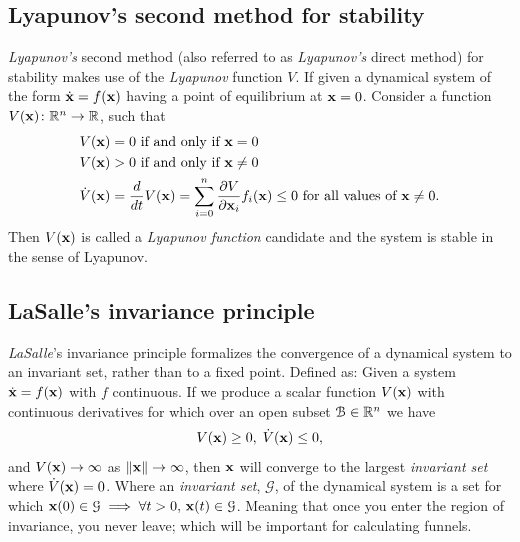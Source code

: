 \subsection{Lyapunov's second method for stability}

\textit{Lyapunov's} second method (also referred to as \textit{Lyapunov's}
direct method) for stability makes use of the \textit{Lyapunov} function \(V\).
If given a dynamical system of the form \(\dot{\mathbf{x}} = f(\mathbf{x})\) having
a point of equilibrium at \(\mathbf{x} = 0\). Consider a function \(V(\mathbf{x})
\colon \mathbb{R}^n \rightarrow \mathbb{R}\), such that
\begin{align*}
  V(\mathbf{x}) &= 0 \text{ if and only if } \mathbf{x} = 0 \\
  V(\mathbf{x}) &> 0 \text{ if and only if } \mathbf{x} \neq 0 \\
  \dot{V}(\mathbf{x}) &= \frac{d}{dt}V(\mathbf{x}) = \sum_{i=0}^{n} \frac{\partial V}{\partial \mathbf{x}_i} f_i(\mathbf{x}) \leq 0 \text{ for all values of } \mathbf{x} \neq 0. \\
\end{align*}
Then \(V(\mathbf{x})\) is called a \textit{Lyapunov function} candidate and the
system is stable in the sense of Lyapunov.

\subsection{LaSalle's invariance principle}
\label{subsec:LaSalle's invariance principle}

\textit{LaSalle}'s invariance principle formalizes the convergence of a
dynamical system to an invariant set, rather than to a fixed point. Defined as:
Given a system \(\dot{\mathbf{x}} = f(\mathbf{x})\) with \(f\) continuous. If we
produce a scalar function \(V(\mathbf{x})\) with continuous derivatives for which
over an open subset \(\mathcal{B} \in \mathbb{R}^n\) we have
\begin{align*}
  V(\mathbf{x}) \geq 0, \; \dot{V}(\mathbf{x}) \leq 0,
\end{align*}
and \(V(\mathbf{x}) \rightarrow \infty\) as \(\lVert\mathbf{x}\rVert \rightarrow
\infty\), then \(\mathbf{x}\) will converge to the largest \textit{invariant set}
where \(\dot{V}(\mathbf{x}) = 0\). Where an \textit{invariant set},
\(\mathcal{G}\), of the dynamical system is a set for which \(\mathbf{x}(0) \in
\mathcal{G} \implies \forall t > 0,\, \mathbf{x}(t) \in \mathcal{G}\). Meaning
that once you enter the region of invariance, you never leave; which will be
important for calculating funnels.

